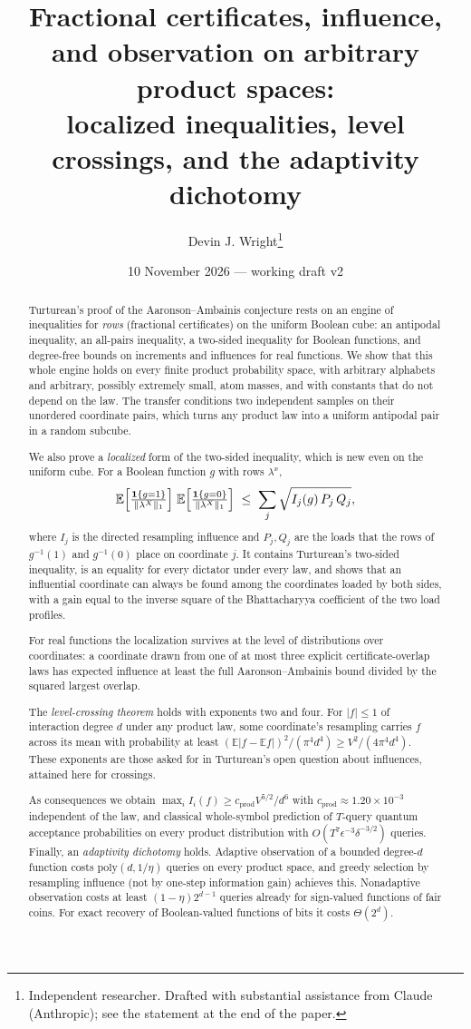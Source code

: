 \documentclass[11pt]{article}
\title{Fractional certificates, influence, and observation on arbitrary product spaces:\\
localized inequalities, level crossings, and the adaptivity dichotomy}
\author{Devin J. Wright\thanks{Independent researcher. Drafted with substantial assistance from Claude (Anthropic); see the statement at the end of the paper.}}
\date{10 November 2026 --- working draft v2}
\numberwithin{equation}{section}
\theoremstyle{definition}
\theoremstyle{remark}
\newcommand{\E}{\mathbb{E}}
\newcommand{\1}{\mathbf 1}
\newcommand{\cprod}{c_{\mathrm{prod}}}
\newcommand{\nrm}[1]{\lVert #1\rVert_1}
\begin{document}
\maketitle

\begin{abstract}
Turturean's proof of the Aaronson--Ambainis conjecture rests on an engine of inequalities for \emph{rows} (fractional certificates) on the uniform Boolean cube: an antipodal inequality, an all-pairs inequality, a two-sided inequality for Boolean functions, and degree-free bounds on increments and influences for real functions. We show that this whole engine holds on every finite product probability space, with arbitrary alphabets and arbitrary, possibly extremely small, atom masses, and with constants that do not depend on the law. The transfer conditions two independent samples on their unordered coordinate pairs, which turns any product law into a uniform antipodal pair in a random subcube.

We also prove a \emph{localized} form of the two-sided inequality, which is new even on the uniform cube. For a Boolean function $g$ with rows $\lambda^x$,
\[
\E\Bigl[\tfrac{\1\{g=1\}}{\nrm{\lambda^X}}\Bigr]\;\E\Bigl[\tfrac{\1\{g=0\}}{\nrm{\lambda^X}}\Bigr]\;\le\;\sum_j\sqrt{I_j(g)\,P_j\,Q_j},
\]
where $I_j$ is the directed resampling influence and $P_j,Q_j$ are the loads that the rows of $g^{-1}(1)$ and $g^{-1}(0)$ place on coordinate $j$. It contains Turturean's two-sided inequality, is an equality for every dictator under every law, and shows that an influential coordinate can always be found among the coordinates loaded by both sides, with a gain equal to the inverse square of the Bhattacharyya coefficient of the two load profiles.

For real functions the localization survives at the level of distributions over coordinates: a coordinate drawn from one of at most three explicit certificate-overlap laws has expected influence at least the full Aaronson--Ambainis bound divided by the squared largest overlap.

The \emph{level-crossing theorem} holds with exponents two and four. For $|f|\le1$ of interaction degree $d$ under any product law, some coordinate's resampling carries $f$ across its mean with probability at least $(\E|f-\E f|)^2/(\pi^4d^4)\ge V^2/(4\pi^4d^4)$. These exponents are those asked for in Turturean's open question about influences, attained here for crossings.

As consequences we obtain $\max_iI_i(f)\ge \cprod V^{5/2}/d^6$ with $\cprod\approx1.20\times10^{-3}$ independent of the law, and classical whole-symbol prediction of $T$-query quantum acceptance probabilities on every product distribution with $O(T^7\epsilon^{-3}\delta^{-3/2})$ queries. Finally, an \emph{adaptivity dichotomy} holds. Adaptive observation of a bounded degree-$d$ function costs $\mathrm{poly}(d,1/\eta)$ queries on every product space, and greedy selection by resampling influence (not by one-step information gain) achieves this. Nonadaptive observation costs at least $(1-\eta)2^{d-1}$ queries already for sign-valued functions of fair coins. For exact recovery of Boolean-valued functions of bits it costs $\Theta(2^d)$.
\end{abstract}
\end{document}

